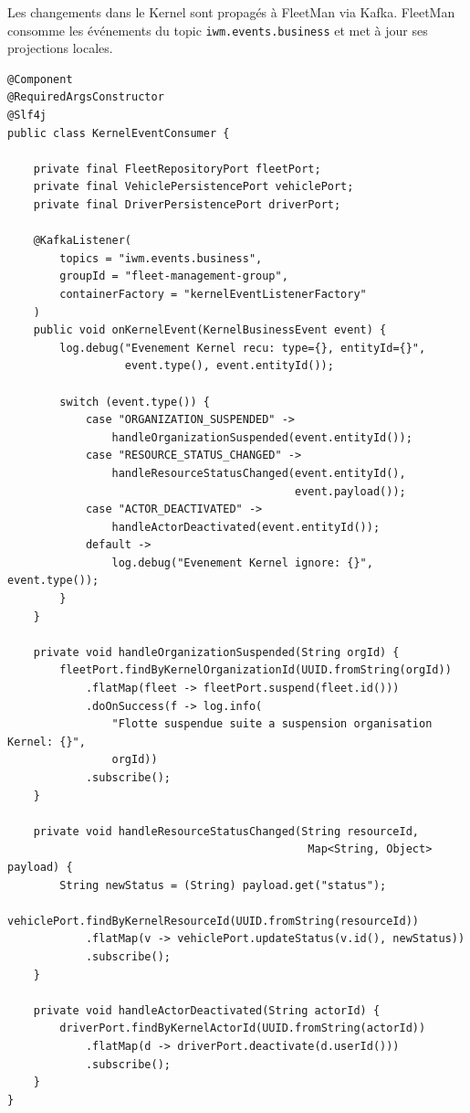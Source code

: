 \documentclass[12pt,a4paper]{report}
\begin{document}
Les changements dans le Kernel sont propagés à FleetMan via Kafka.
FleetMan consomme les événements du topic \texttt{iwm.events.business}
et met à jour ses projections locales.

\begin{lstlisting}[style=javaStyle, caption={Consommateur d'événements Kernel}]
@Component
@RequiredArgsConstructor
@Slf4j
public class KernelEventConsumer {

    private final FleetRepositoryPort fleetPort;
    private final VehiclePersistencePort vehiclePort;
    private final DriverPersistencePort driverPort;

    @KafkaListener(
        topics = "iwm.events.business",
        groupId = "fleet-management-group",
        containerFactory = "kernelEventListenerFactory"
    )
    public void onKernelEvent(KernelBusinessEvent event) {
        log.debug("Evenement Kernel recu: type={}, entityId={}",
                  event.type(), event.entityId());

        switch (event.type()) {
            case "ORGANIZATION_SUSPENDED" ->
                handleOrganizationSuspended(event.entityId());
            case "RESOURCE_STATUS_CHANGED" ->
                handleResourceStatusChanged(event.entityId(),
                                            event.payload());
            case "ACTOR_DEACTIVATED" ->
                handleActorDeactivated(event.entityId());
            default ->
                log.debug("Evenement Kernel ignore: {}", event.type());
        }
    }

    private void handleOrganizationSuspended(String orgId) {
        fleetPort.findByKernelOrganizationId(UUID.fromString(orgId))
            .flatMap(fleet -> fleetPort.suspend(fleet.id()))
            .doOnSuccess(f -> log.info(
                "Flotte suspendue suite a suspension organisation Kernel: {}",
                orgId))
            .subscribe();
    }

    private void handleResourceStatusChanged(String resourceId,
                                              Map<String, Object> payload) {
        String newStatus = (String) payload.get("status");
        vehiclePort.findByKernelResourceId(UUID.fromString(resourceId))
            .flatMap(v -> vehiclePort.updateStatus(v.id(), newStatus))
            .subscribe();
    }

    private void handleActorDeactivated(String actorId) {
        driverPort.findByKernelActorId(UUID.fromString(actorId))
            .flatMap(d -> driverPort.deactivate(d.userId()))
            .subscribe();
    }
}
\end{lstlisting}
\end{document}

